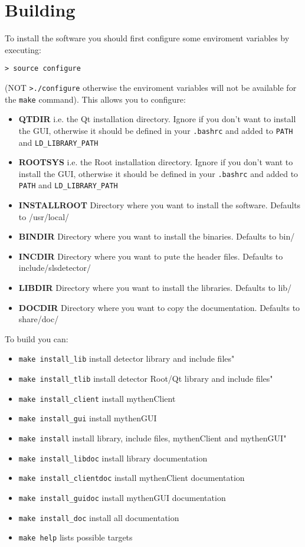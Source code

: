 \documentclass{report}
\begin{document}
\section{Building}
To install the software you should first configure some enviroment variables by executing: 
\begin{verbatim}
> source configure
\end{verbatim}
(NOT \verb=>./configure= otherwise the enviroment variables will not be available for the \verb=make= command). 
This allows you to configure:
\begin{itemize}
\item \textbf{QTDIR} i.e. the Qt installation directory. Ignore if you don't want to install the GUI, otherwise it should be defined in your \verb=.bashrc= and added to \verb=PATH= and \verb=LD_LIBRARY_PATH= 
\item  \textbf{ROOTSYS} i.e. the Root installation directory. Ignore if you don't want to install the GUI, otherwise it should be defined in your \verb=.bashrc= and added to \verb=PATH= and \verb=LD_LIBRARY_PATH=
\item \textbf{INSTALLROOT} Directory where you want to install the software. Defaults to /usr/local/
\item \textbf{BINDIR} Directory where you want to install the binaries. Defaults to bin/
\item \textbf{INCDIR} Directory where you want to pute the header files. Defaults to include/slsdetector/
\item \textbf{LIBDIR} Directory where you want to install the libraries. Defaults to lib/
\item \textbf{DOCDIR} Directory where you want to copy the documentation. Defaults to share/doc/
\end{itemize}

To build you can:
\begin{itemize}
\item \verb=make install_lib=       install detector library and include files"
\item \verb=make install_tlib=        install detector Root/Qt library and include files"
\item \verb=make install_client=     install mythenClient
\item \verb=make install_gui=        install mythenGUI
\item \verb=make install=            install library, include files, mythenClient and mythenGUI"
\item \verb=make install_libdoc=     install library documentation
\item \verb=make install_clientdoc=  install mythenClient documentation
\item \verb=make install_guidoc=     install mythenGUI documentation
\item \verb=make install_doc=        install all documentation
\item \verb=make help=               lists possible targets
\end{itemize}
\end{document}
